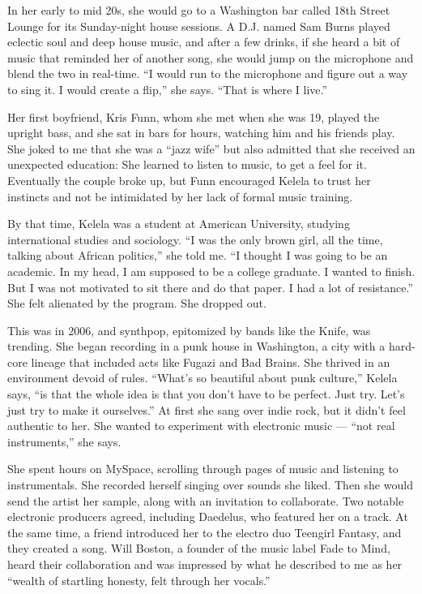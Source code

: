 In her early to mid 20s, she would go to a Washington bar called 18th
Street Lounge for its Sunday-night house sessions. A D.J. named Sam
Burns played eclectic soul and deep house music, and after a few drinks,
if she heard a bit of music that reminded her of another song, she would
jump on the microphone and blend the two in real-time. ``I would run to
the microphone and figure out a way to sing it. I would create a flip,''
she says. ``That is where I live.''

Her first boyfriend, Kris Funn, whom she met when she was 19, played the
upright bass, and she sat in bars for hours, watching him and his
friends play. She joked to me that she was a ``jazz wife'' but also
admitted that she received an unexpected education: She learned to
listen to music, to get a feel for it. Eventually the couple broke up,
but Funn encouraged Kelela to trust her instincts and not be intimidated
by her lack of formal music training.

By that time, Kelela was a student at American University, studying
international studies and sociology. ``I was the only brown girl, all
the time, talking about African politics,'' she told me. ``I thought I
was going to be an academic. In my head, I am supposed to be a college
graduate. I wanted to finish. But I was not motivated to sit there and
do that paper. I had a lot of resistance.'' She felt alienated by the
program. She dropped out.

This was in 2006, and synthpop, epitomized by bands like the Knife, was
trending. She began recording in a punk house in Washington, a city with
a hard-core lineage that included acts like Fugazi and Bad Brains. She
thrived in an environment devoid of rules. ``What's so beautiful about
punk culture,'' Kelela says, ``is that the whole idea is that you don't
have to be perfect. Just try. Let's just try to make it ourselves.'' At
first she sang over indie rock, but it didn't feel authentic to her. She
wanted to experiment with electronic music --- ``not real instruments,''
she says.

She spent hours on MySpace, scrolling through pages of music and
listening to instrumentals. She recorded herself singing over sounds she
liked. Then she would send the artist her sample, along with an
invitation to collaborate. Two notable electronic producers agreed,
including Daedelus, who featured her on a track. At the same time, a
friend introduced her to the electro duo Teengirl Fantasy, and they
created a song. Will Boston, a founder of the music label Fade to Mind,
heard their collaboration and was impressed by what he described to me
as her ``wealth of startling honesty, felt through her vocals.''

